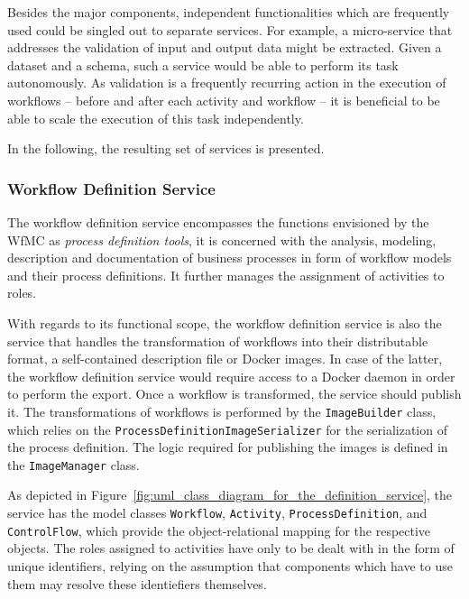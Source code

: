   Besides the major components, independent functionalities which are frequently used could be singled out to separate services. For example, a micro-service that addresses the validation of input and output data might be extracted. Given a dataset and a schema, such a service would be able to perform its task autonomously. As validation is a frequently recurring action in the execution of workflows -- before and after each activity and workflow -- it is beneficial to be able to scale the execution of this task independently.

  In the following, the resulting set of services is presented.

  \subsubsection{Workflow Definition Service} %
    \label{subs:workflow_definition_service}

    The workflow definition service encompasses the functions envisioned by the \ac{WfMC} as \emph{process definition tools}, \ie it is concerned with the analysis, modeling, description and documentation of business processes in form of workflow models and their process definitions. It further manages the assignment of activities to roles.

    With regards to its functional scope, the workflow definition service is also the service that handles the transformation of workflows into their distributable format, \eg a self-contained description file or Docker images. In case of the latter, the workflow definition service would require access to a Docker daemon in order to perform the export. Once a workflow is transformed, the service should publish it. The transformations of workflows is performed by the \texttt{ImageBuilder} class, which relies on the \texttt{ProcessDefinitionImageSerializer} for the serialization of the process definition. The logic required for publishing the images is defined in the \texttt{ImageManager} class.


    As depicted in Figure~\ref{fig:uml_class_diagram_for_the_definition_service},
    the service has the model classes \texttt{Workflow}, \texttt{Activity}, \texttt{ProcessDefinition}, and \texttt{ControlFlow}, which provide the object-relational mapping for the respective objects. The roles assigned to activities have only to be dealt with in the form of unique identifiers, relying on the assumption that components which have to use them may resolve these identiefiers themselves.

